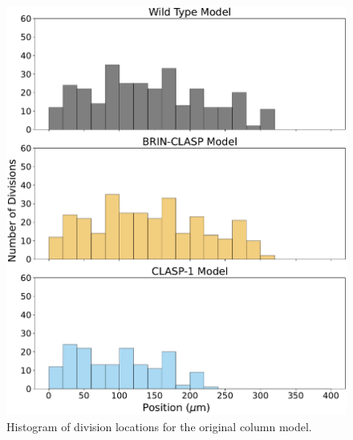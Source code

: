 \documentclass[referee,pdflatex,sn-mathphys-num]{sn-jnl}
\begin{document}
\begin{appendices}
\begin{figure}
  \centering
  \includegraphics[width=\textwidth]{column-original-histogram.pdf}
  \caption{Histogram of division locations for the original column model.}
\end{figure}


\end{appendices}
\end{document}
